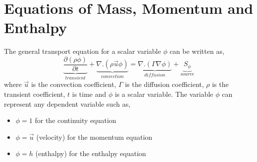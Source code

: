 \section{Equations of Mass, Momentum and Enthalpy}

The general transport equation for a scalar variable $\phi$ can
be written as,
\begin{equation}
\underbrace{
\frac{\partial (\rho \phi)}{\partial t}
}_{transient}
+
\underbrace{
\nabla.(\rho \vec{u} \phi)
}_{convection}
=
\underbrace{
\nabla.(\Gamma\nabla\phi) 
}_{diffusion}
+
\underbrace{
S_{\phi}
}_{source}
\label{eqn:num:gen}
\end{equation}
where $\vec{u}$ is the convection coefficient, $\Gamma$ is the
diffusion coefficient, $\rho$ is the transient coefficient, $t$ is
time and $\phi$ is a scalar variable.  The variable $\phi$ can
represent any dependent variable such as,
\begin{itemize}
\item
$\phi=1$ for the  continuity equation
\item
$\phi=\vec{u}$ (velocity) for the  momentum equation
\item
$\phi=h$ (enthalpy) for the  enthalpy equation
\end{itemize}
